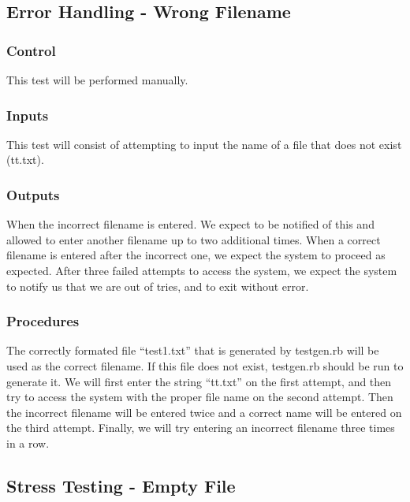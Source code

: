 \documentclass[]{article}
\begin{document}
\subsection{Error Handling - Wrong Filename}
	\subsubsection{Control}
	This test will be performed manually.
	
	\subsubsection{Inputs}
	This test will consist of attempting to input the name of a file that does not
	exist (tt.txt).
	
	\subsubsection{Outputs}
	When the incorrect filename is entered.  We expect to be notified of this and
	allowed to enter another filename up to two additional times.  When a correct
	filename is entered after the incorrect one, we expect the system to proceed as
	expected.  After three failed attempts to access the system, we expect the
	system to notify us that we are out of tries, and to exit without error.
	
	\subsubsection{Procedures}
	The correctly formated file ``test1.txt'' that is generated by testgen.rb will
	be used as the correct filename.  If this file does not exist, testgen.rb
	should be run to generate it. We will first enter the string ``tt.txt'' on the
	first attempt, and then try to access the system with the proper file name on
	the second attempt. Then the incorrect filename will be entered twice and a
	correct name will be entered on the third attempt. Finally, we will try
	entering an incorrect filename three times in a row.
	

\subsection{Stress Testing - Empty File}
\end{document}
